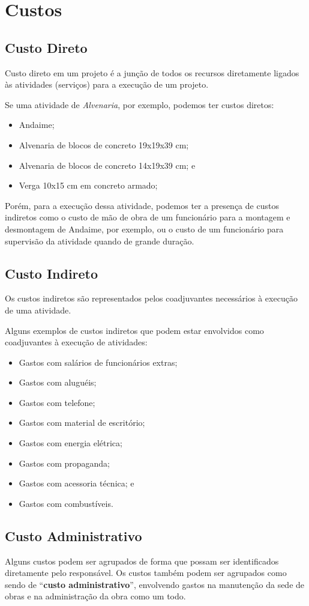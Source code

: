\chapter{Custos}

\section{Custo Direto}

Custo direto em um projeto é a junção de todos os recursos diretamente ligados às atividades (serviços) para a execução de um projeto.

Se uma atividade de \emph{Alvenaria}, por exemplo, podemos ter custos diretos:

\begin{itemize}
	\item Andaime;
	\item Alvenaria de blocos de concreto 19x19x39 cm;
	\item Alvenaria de blocos de concreto 14x19x39 cm; e
	\item Verga 10x15 cm em concreto armado;
\end{itemize}

Porém, para a execução dessa atividade, podemos ter a presença de custos indiretos como o custo de mão de obra de um funcionário para a montagem e desmontagem de Andaime, por exemplo, ou o custo de um funcionário para supervisão da atividade quando de grande duração.

\section{Custo Indireto}

Os custos indiretos são representados pelos coadjuvantes necessários à execução de uma atividade.

Alguns exemplos de custos indiretos que podem estar envolvidos como coadjuvantes à execução de atividades:

\begin{itemize}
	\item Gastos com salários de funcionários extras;
	\item Gastos com aluguéis;
	\item Gastos com telefone;
	\item Gastos com material de escritório;
	\item Gastos com energia elétrica;
	\item Gastos com propaganda;
	\item Gastos com acessoria técnica; e
	\item Gastos com combustíveis.
\end{itemize}

\section{Custo Administrativo}

Alguns custos podem ser agrupados de forma que possam ser identificados diretamente pelo responsável. Os custos também podem ser agrupados como sendo de ``\textbf{custo administrativo}'', envolvendo gastos na manutenção da sede de obras e na administração da obra como um todo.